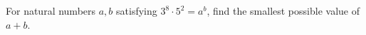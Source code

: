 For natural numbers $a, b$ satisfying $3^{8}\cdot5^{2}=a^{b}$, find the smallest possible value of $a+b$.
